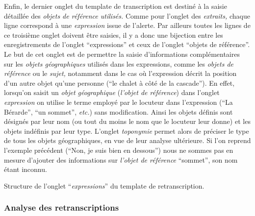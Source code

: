 Enfin, le dernier onglet du template de transcription est destiné à la
saisie détaillée des \emph{objets de référence utilisés.} Comme pour
l'onglet des \emph{extraits,} chaque ligne correspond à une
\emph{expression} issue de l'alerte. Par ailleurs toutes les lignes de
ce troisième onglet doivent être saisies, il y a donc une bijection
entre les enregistrements de l'onglet \enquote{expressions} et ceux de
l'onglet \enquote{objets de référence}. Le but de cet onglet est de
permettre la saisie d'informations complémentaires sur les
\emph{objets géographiques} utilisés dans les expressions, comme les
\emph{objets de référence} ou le \emph{sujet,} notamment dans le cas
où l'expression décrit la position d'un autre objet qu'une personne
(\eg \enquote{le chalet à côté de la cascade}). En effet, lorsqu'on
saisit un \emph{objet géographique} (\eg \emph{l'objet de référence})
dans l'onglet \emph{expression} on utilise le terme employé par le
locuteur dans l'expression (\eg \enquote{La Bérarde}, \enquote{un
  sommet}, \emph{etc.}) sans modification. Ainsi les objets définis
sont désignés par leur nom (ou tout du moins le nom que le locuteur
leur donne) et les objets indéfinis par leur type. L'onglet
\emph{toponymie} permet alors de préciser le type de tous les objets
géographiques, en vue de leur analyse ultérieure. Si l'on reprend
l'exemple précédent (\ie \enquote{Non, je suis bien en dessous}) nous
ne sommes pas en mesure d'ajouter des informations sur \emph{l'objet
  de référence} \enquote{sommet}, son nom étant inconnu.

\begin{table}
  \centering
  
  \caption{Structure de l'onglet \enquote{\emph{expressions}} du
    template de retranscription.}
  \label{tab:struct_temp}
\end{table}

\subsubsection{Analyse des retranscriptions}

